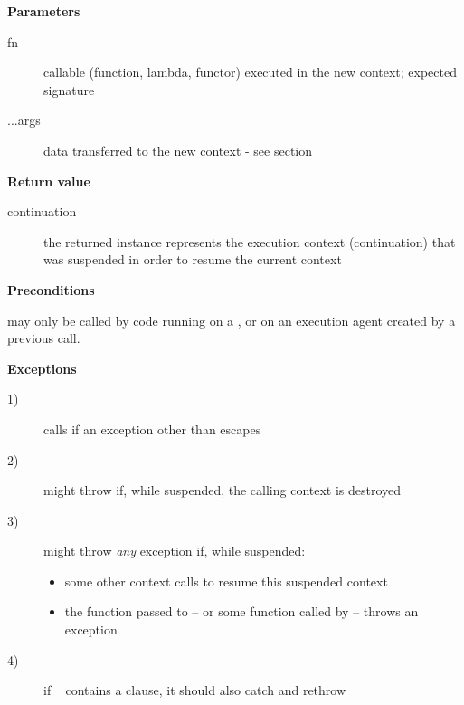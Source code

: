 {\bfseries Parameters}
\begin{description}
    \item[fn]      callable (function, lambda, functor) executed in the new
                   context; expected signature  
    \item[...args] data transferred to the new context - see section
                   \\
\end{description}

{\bfseries Return value}
\begin{description}
    \item[continuation] the returned instance represents the execution context
                        (continuation) that was suspended in order to
                        resume the current context
\end{description}

{\bfseries Preconditions}
\begin{description}
    \item \callcc may only be called by code running on a ,
    or on an execution agent created by a previous \callcc call.
\end{description}

{\bfseries Exceptions}
\begin{description}
    \item[1)] calls  if an exception other
              than \unwindex escapes \entryfn\ 
    \item[2)] \callcc might throw \unwindex if,
              while suspended, the calling context is destroyed
    \item[3)] \callcc might throw \emph{any} exception if, while
              suspended:
        \begin{itemize}
            \item some other context calls \resumewith to resume
              this suspended context
            \item the function  passed to \resumewith --
              or some function called by  -- throws an exception
        \end{itemize}
    \item[4)] if \entryfn\  contains a  clause, it
              should also catch and rethrow \unwindex
\end{description}


